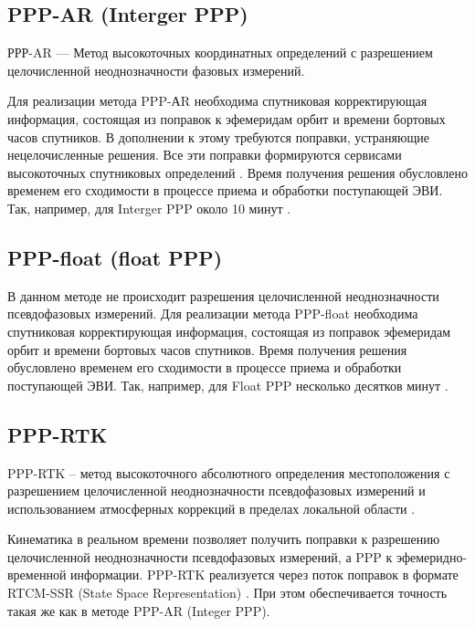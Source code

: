 \subsection{PPP-AR (Interger PPP)}\label{subsec:ch1/sec2/sub1}

РРР-AR --- Метод высокоточных координатных определений с разрешением целочисленной неоднозначности фазовых измерений.

Для реализации метода PPP-АR необходима спутниковая корректирующая информация, состоящая из поправок к эфемеридам орбит и времени бортовых часов спутников. В дополнении к этому требуются поправки, устраняющие нецелочисленные решения. Все эти поправки формируются сервисами высокоточных спутниковых определений \cite{src41}.  Время получения решения обусловлено временем его сходимости в процессе приема и обработки поступающей ЭВИ. Так, например, для Interger PPP около 10 минут \cite{src54,src57}.

\subsection{PPP-float (float PPP)}\label{subsec:ch1/sec2/sub2}

В данном методе не происходит разрешения целочисленной неоднозначности псевдофазовых измерений. Для реализации метода PPP-float необходима спутниковая корректирующая информация, состоящая из поправок эфемеридам орбит и времени бортовых часов спутников. Время получения решения обусловлено временем его сходимости в процессе приема и обработки поступающей ЭВИ. Так, например, для Float PPP несколько десятков минут \cite{src53,src57,src66}.

\subsection{PPP-RTK}\label{subsec:ch1/sec2/sub3}

PPP-RTK – метод высокоточного абсолютного определения местоположения с разрешением целочисленной неоднозначности псевдофазовых измерений и использованием атмосферных коррекций в пределах локальной области \cite{src68,src71}. 

Кинематика в реальном времени позволяет получить поправки к разрешению целочисленной неоднозначности псевдофазовых измерений, а PPP к эфемеридно-временной информации. PPP-RTK реализуется через поток поправок в формате RTCM-SSR (State Space Representation) \cite{src78,src79}. При этом обеспечивается точность такая же как в методе PPP-AR (Integer PPP). 




